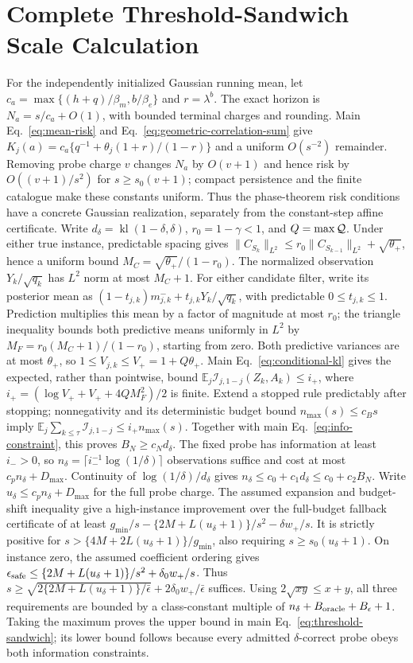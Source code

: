 \documentclass[journal]{IEEEtran}
\newcommand{\E}{\mathbb E}
\begin{document}
\section{Complete Threshold-Sandwich Scale Calculation}
For the independently initialized Gaussian running mean, let $c_a=\max\{(h+q)/\beta_m,b/\beta_e\}$ and $r=\lambda^b$.
The exact horizon is $N_a=s/c_a+O(1)$, with bounded terminal charges and rounding.
Main Eq.~\eqref{eq:mean-risk} and Eq.~\eqref{eq:geometric-correlation-sum} give $K_j(a)=c_a\{q^{-1}+\theta_j(1+r)/(1-r)\}$ and a uniform $O(s^{-2})$ remainder.
Removing probe charge $v$ changes $N_a$ by $O(v+1)$ and hence risk by $O((v+1)/s^2)$ for $s\ge s_0(v+1)$; compact persistence and the finite catalogue make these constants uniform.
Thus the phase-theorem risk conditions have a concrete Gaussian realization, separately from the constant-step affine certificate.
Write $d_\delta=\operatorname{kl}(1-\delta,\delta)$, $r_0=1-\gamma<1$, and $Q=\max{\cal Q}$.
Under either true instance, predictable spacing gives $\|C_{S_k}\|_{L^2}\le r_0\|C_{S_{k-1}}\|_{L^2}+\sqrt{\theta_+}$, hence a uniform bound $M_C=\sqrt{\theta_+}/(1-r_0)$.
The normalized observation $Y_k/\sqrt{q_k}$ has $L^2$ norm at most $M_C+1$.
For either candidate filter, write its posterior mean as $(1-t_{j,k})m^-_{j,k}+t_{j,k}Y_k/\sqrt{q_k}$, with predictable $0\le t_{j,k}\le1$.
Prediction multiplies this mean by a factor of magnitude at most $r_0$; the triangle inequality bounds both predictive means uniformly in $L^2$ by $M_F=r_0(M_C+1)/(1-r_0)$, starting from zero.
Both predictive variances are at most $\theta_+$, so $1\le V_{j,k}\le V_+=1+Q\theta_+$.
Main Eq.~\eqref{eq:conditional-kl} gives the expected, rather than pointwise, bound $\E_j\mathcal I_{j,1-j}(Z_k,A_k)\le i_+$, where $i_+=(\log V_++V_++4QM_F^2)/2$ is finite.
Extend a stopped rule predictably after stopping; nonnegativity and its deterministic budget bound $n_{\max}(s)\le c_Bs$ imply $\E_j\sum_{k\le\tau}\mathcal I_{j,1-j}\le i_+n_{\max}(s)$.
Together with main Eq.~\eqref{eq:info-constraint}, this proves $B_N\ge c_Nd_\delta$.
The fixed probe has information at least $i_->0$, so $n_\delta=\lceil i_-^{-1}\log(1/\delta)\rceil$ observations suffice and cost at most $c_pn_\delta+D_{\max}$.
Continuity of $\log(1/\delta)/d_\delta$ gives $n_\delta\le c_0+c_1d_\delta\le c_0+c_2B_N$.
Write $u_\delta\le c_pn_\delta+D_{\max}$ for the full probe charge.
The assumed expansion and budget-shift inequality give a high-instance improvement over the full-budget fallback certificate of at least $g_{\min}/s-\{2M+L(u_\delta+1)\}/s^2-\delta w_+/s$.
It is strictly positive for $s>\{4M+2L(u_\delta+1)\}/g_{\min}$, also requiring $s\ge s_0(u_\delta+1)$.
On instance zero, the assumed coefficient ordering gives $\epsilon_{\rm safe}\le\{2M+L(u_\delta+1)\}/s^2+\delta_0w_+/s$.
Thus $s\ge\sqrt{2\{2M+L(u_\delta+1)\}/\bar\epsilon}+2\delta_0w_+/\bar\epsilon$ suffices.
Using $2\sqrt{xy}\le x+y$, all three requirements are bounded by a class-constant multiple of $n_\delta+B_{\rm oracle}+B_\epsilon+1$.
Taking the maximum proves the upper bound in main Eq.~\eqref{eq:threshold-sandwich}; its lower bound follows because every admitted $\delta$-correct probe obeys both information constraints.
\end{document}
